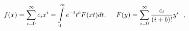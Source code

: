 \begin{equation}
f(x) = \sum_{i = 0}^{\infty} c_i x^i = \int\limits_0^{\infty} 
e^{-t} t^b F(xt) dt, \ \ \ \ \   
\nonumber\\
F(y) = \sum_{i = 0}^{\infty} {c_i \over (i + b)!} y^i \ \ , 
\label{eq:7}
\end{equation}

